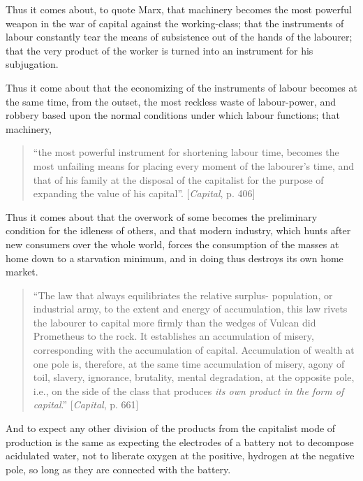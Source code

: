 Thus it comes about, to quote Marx, that machinery becomes the most powerful
weapon in the war of capital against the working-class; that the instruments of
labour constantly tear the means of subsistence out of the hands of the
labourer; that the very product of the worker is turned into an instrument for
his subjugation.

Thus it come about that the economizing of the instruments of labour becomes at
the same time, from the outset, the most reckless waste of labour-power, and
robbery based upon the normal conditions under which labour functions; that
machinery,
%
\begin{quote}
  ``the most powerful instrument for shortening labour time, becomes the most
  unfailing means for placing every moment of the labourer's time, and that of
  his family at the disposal of the capitalist for the purpose of expanding the
  value of his capital''. [\emph{Capital}, p. 406]
\end{quote}

Thus it comes about that the overwork of some becomes the preliminary condition
for the idleness of others, and that modern industry, which hunts after new
consumers over the whole world, forces the consumption of the masses at home
down to a starvation minimum, and in doing thus destroys its own home market.
%
\begin{quote}
  ``The law that always equilibriates the relative surplus- population, or
  industrial army, to the extent and energy of accumulation, this law rivets the
  labourer to capital more firmly than the wedges of Vulcan did Prometheus to
  the rock. It establishes an accumulation of misery, corresponding with the
  accumulation of capital. Accumulation of wealth at one pole is, therefore, at
  the same time accumulation of misery, agony of toil, slavery, ignorance,
  brutality, mental degradation, at the opposite pole, i.e., on the side of the
  class that produces \emph{its own product in the form of capital}.''
  [\emph{Capital}, p. 661]
\end{quote}
%
And to expect any other division of the products from the capitalist mode of
production is the same as expecting the electrodes of a battery not to decompose
acidulated water, not to liberate oxygen at the positive, hydrogen at the
negative pole, so long as they are connected with the battery.

